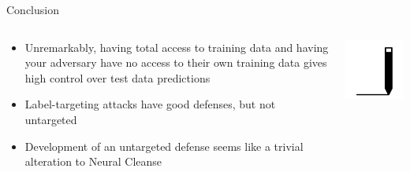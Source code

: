 \documentclass[pdf]{beamer}
\begin{document}
\begin{frame}[fragile]{Conclusion}
\begin{minipage}[0.2\textheight]{\textwidth}
\begin{columns}[T]
\begin{column}{0.5\textwidth}
\begin{itemize}
\item Unremarkably, having total access to training data and having your adversary have no access to their own training data gives high control over test data predictions
\item Label-targeting attacks have good defenses, but not untargeted
\item Development of an untargeted defense seems like a trivial alteration to Neural Cleanse
\end{itemize}
\end{column}
\begin{column}{0.5\textwidth}
\includegraphics[width=5cm]{Images/conclusion.png}
\end{column}
\end{columns}
\end{minipage}
\end{frame}
\end{document}
